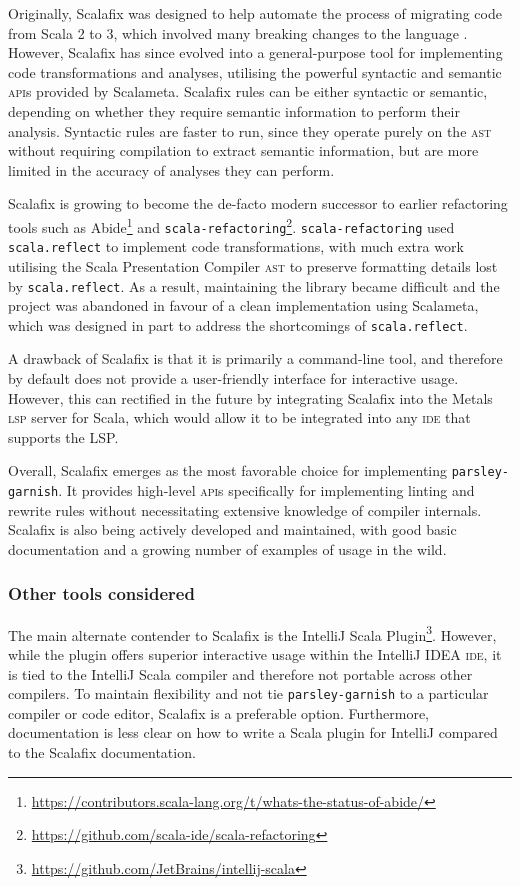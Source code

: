 Originally, Scalafix was designed to help automate the process of migrating code from Scala 2 to 3, which involved many breaking changes to the language \cite{geirsson_scalafix_2016}.
However, Scalafix has since evolved into a general-purpose tool for implementing code transformations and analyses, utilising the powerful syntactic and semantic \textsc{api}s provided by Scalameta.
Scalafix rules can be either syntactic or semantic, depending on whether they require semantic information to perform their analysis.
Syntactic rules are faster to run, since they operate purely on the \textsc{ast} without requiring compilation to extract semantic information, but are more limited in the accuracy of analyses they can perform.

Scalafix is growing to become the de-facto modern successor to earlier refactoring tools such as Abide\footnote{\url{https://contributors.scala-lang.org/t/whats-the-status-of-abide/}} and \texttt{scala-refactoring}\footnote{\url{https://github.com/scala-ide/scala-refactoring}}.
\texttt{scala-refactoring} used \texttt{scala.reflect} to implement code transformations, with much extra work utilising the Scala Presentation Compiler \textsc{ast} to preserve formatting details lost by \texttt{scala.reflect}.
As a result, maintaining the library became difficult and the project was abandoned in favour of a clean implementation using Scalameta, which was designed in part to address the shortcomings of \texttt{scala.reflect}.

A drawback of Scalafix is that it is primarily a command-line tool, and therefore by default does not provide a user-friendly interface for interactive usage.
However, this can rectified in the future by integrating Scalafix into the Metals \textsc{lsp} server for Scala, which would allow it to be integrated into any \textsc{ide} that supports the LSP.

Overall, Scalafix emerges as the most favorable choice for implementing \texttt{parsley-garnish}.
It provides high-level \textsc{api}s specifically for implementing linting and rewrite rules without necessitating extensive knowledge of compiler internals.
Scalafix is also being actively developed and maintained, with good basic documentation and a growing number of examples of usage in the wild.

\subsubsection{Other tools considered}
The main alternate contender to Scalafix is the IntelliJ Scala Plugin\footnote{\url{https://github.com/JetBrains/intellij-scala}}.
However, while the plugin offers superior interactive usage within the IntelliJ IDEA \textsc{ide}, it is tied to the IntelliJ Scala compiler and therefore not portable across other compilers.
To maintain flexibility and not tie \texttt{parsley-garnish} to a particular compiler or code editor, Scalafix is a preferable option.
Furthermore, documentation is less clear on how to write a Scala plugin for IntelliJ compared to the Scalafix documentation.

